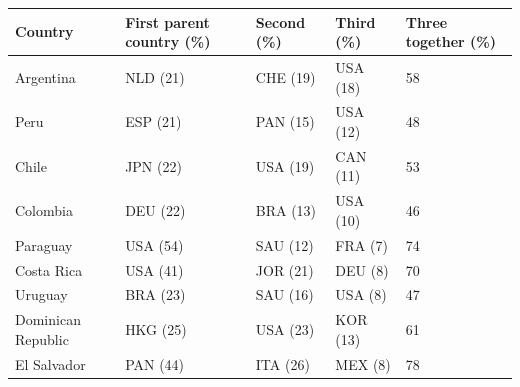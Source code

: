 \begin{tabular}{lllll}
\toprule
Country & First parent country (\%) & Second (\%) & Third (\%) & Three together (\%) \\
\midrule
Argentina & NLD (21) & CHE (19) & USA (18) & 58 \\
Peru & ESP (21) & PAN (15) & USA (12) & 48 \\
Chile & JPN (22) & USA (19) & CAN (11) & 53 \\
Colombia & DEU (22) & BRA (13) & USA (10) & 46 \\
Paraguay & USA (54) & SAU (12) & FRA (7) & 74 \\
Costa Rica & USA (41) & JOR (21) & DEU (8) & 70 \\
Uruguay & BRA (23) & SAU (16) & USA (8) & 47 \\
Dominican Republic & HKG (25) & USA (23) & KOR (13) & 61 \\
El Salvador & PAN (44) & ITA (26) & MEX (8) & 78 \\
\bottomrule
\end{tabular}
